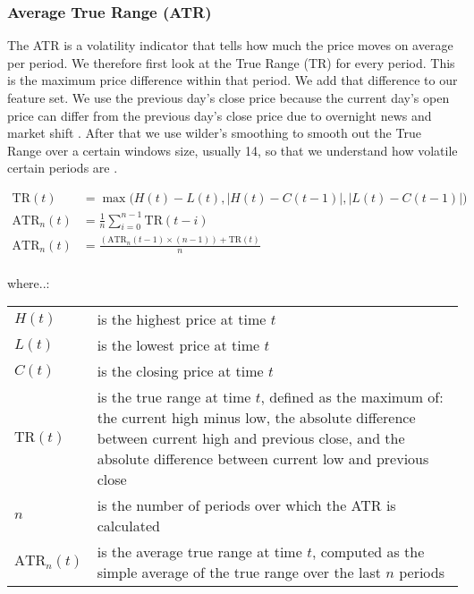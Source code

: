 \documentclass[a4paper,12pt]{report}
\begin{document}
			\subsubsection{Average True Range (ATR)}
			
			The ATR is a volatility indicator that tells how much the price moves on average per period. We therefore first look at the True Range (TR) for every period. This is the maximum price difference within that period. We add that difference to our feature set. We use the previous day’s close price because the current day’s open price can differ from the previous day’s close price due to overnight news and market shift \cite{30}. After that we use wilder’s smoothing to smooth out the True Range over a certain windows size, usually 14, so that we understand how volatile certain periods are \cite{31}. 
			
			
\begin{equation}
\begin{aligned}
  \text{TR}(t) &= \max \big( H(t) - L(t), |H(t) - C(t-1)|, |L(t) - C(t-1)| \big) \\
  \text{ATR}_n(t) &= \frac{1}{n} \sum_{i=0}^{n-1} \text{TR}(t - i)\\
  \text{ATR}_n(t) &= \frac{(\text{ATR}_n(t-1) \times (n - 1)) + \text{TR}(t)}{n}\\
\end{aligned}
\end{equation}


\begin{minipage}{\textwidth}

where..:\\

\begin{tabularx}{\textwidth}{@{}l@{\hspace{2em}--\hspace{2em}}X@{}}
  $H(t)$       & is the highest price at time $t$ \\
  $L(t)$       & is the lowest price at time $t$ \\
  $C(t)$       & is the closing price at time $t$ \\
  $\text{TR}(t)$ & is the true range at time $t$, defined as the maximum of: the current high minus low, the absolute difference between current high and previous close, and the absolute difference between current low and previous close \\
  $n$          & is the number of periods over which the ATR is calculated \\
  $\text{ATR}_n(t)$ & is the average true range at time $t$, computed as the simple average of the true range over the last $n$ periods \\
\end{tabularx}
\end{minipage}
\end{document}
